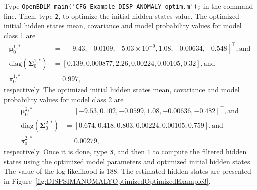 Type \colorbox{light-gray}{\lstinline[basicstyle = \mlttfamily \small, backgroundcolor = \color{light-gray}]!OpenBDLM_main('CFG_Example_DISP_ANOMALY_optim.m');!} in the \MATLAB{} command line.
Then, type  \colorbox{light-gray}{\lstinline[basicstyle = \mlttfamily \small, backgroundcolor = \color{light-gray}]!2!}, to optimize the initial hidden states value.
The optimized initial hidden states mean, covariance  and model probability values for model class 1 are 
\begin{align*}
 \bm \mu^{1,\text{*}}_{0} & = [	-9.43 ,	-0.0109	, -5.03\times 10^{-9}	, 1.08  ,	-0.00634	, -0.548    ]^{\intercal}, \text{and} \\
 \text{diag}(\bm\Sigma^{1,\text{*}}_{0})  & = [	0.139 ,	0.000877,	2.26  	,0.00224	,0.00105,	0.32     ],  \text{and} \\
 \pi_{0}^{1,\text{*}} & = 0.997,
\end{align*}
respectively.
The optimized initial hidden states mean, covariance  and model probability values for model class 2 are 
\begin{align*}
 \bm \mu^{2,\text{*}}_{0} & = [	-9.53 ,	0.102 ,	-0.0599	,  1.08  ,	-0.00636, 	-0.482     ]^{\intercal}, \text{and} \\
 \text{diag}(\bm\Sigma^{2,\text{*}}_{0})  & = [	0.674 	,0.418 ,	0.803 ,	0.00224,	0.00105	, 0.759    ], \text{and} \\
 \pi_{0}^{2,\text{*}} & = 0.00279,
\end{align*}
respectively.
Once it is done, type  \colorbox{light-gray}{\lstinline[basicstyle = \mlttfamily \small, backgroundcolor = \color{light-gray}]!3!}, and then  \colorbox{light-gray}{\lstinline[basicstyle = \mlttfamily \small, backgroundcolor = \color{light-gray}]!1!} to compute the filtered hidden states using the optimized model parameters and optimized initial hidden states.
The value of the log-likelihood is $188$.
The estimated hidden states are presented in Figure~\ref{fig:DISPSIMANOMALYOptimizedOptimizedExample3}.



